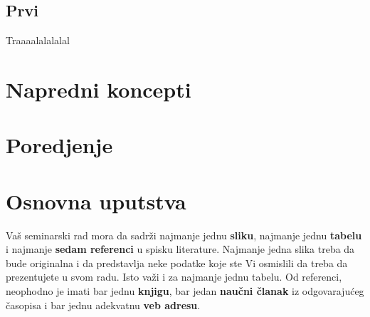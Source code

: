 \documentclass[a4paper]{article}
\begin{document}
\subsection{Prvi}
Traaaalalalalal

\section{Napredni koncepti}

\section{Poredjenje}




\section{Osnovna uputstva}
Vaš seminarski rad mora da sadrži najmanje jednu \textbf{sliku}, najmanje jednu \textbf{tabelu} i najmanje \textbf{sedam referenci} u spisku literature. Najmanje jedna slika treba da bude originalna i da predstavlja neke podatke koje ste Vi osmislili da treba da prezentujete u svom radu. Isto važi i za najmanje jednu tabelu. 	Od referenci, neophodno je imati bar jednu \textbf{knjigu}, bar jedan \textbf{naučni članak} iz odgovarajućeg časopisa i bar jednu adekvatnu \textbf{veb adresu}. 
\end{document}
